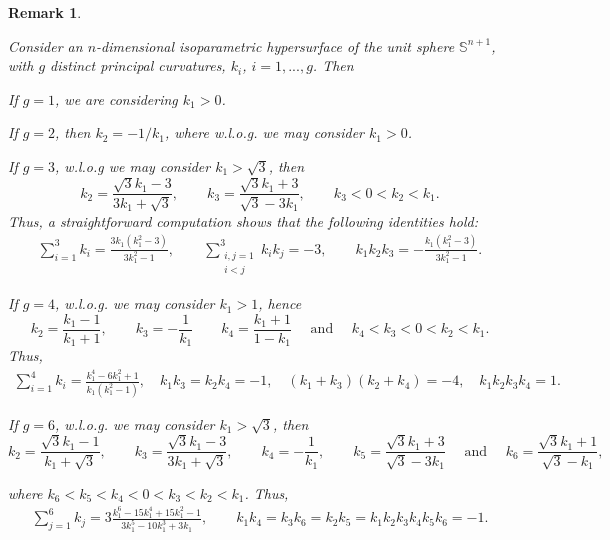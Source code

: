 \documentclass[11pt,a4paper,reqno]{amsproc}
\numberwithin{equation}{section}
\newtheorem{remark}[theorem]{\bf Remark}
\begin{document}
\begin{remark} \label{relaki}{\rm Consider an $n$-dimensional isoparametric hypersurface of the unit sphere $\mathbb{S}^{n+1}$,  
with $g$ distinct principal curvatures, $k_i$, $i=1,...,g$. Then 

 If $g=1$, we are considering $k_1>0$.

 If $g=2$, then  
$k_2=-{1}/{k_{1}}$, where w.l.o.g. we may consider $k_1>0$. 


 If $g=3$, w.l.o.g we may consider $k_{1}>\sqrt{3}$, then 
\[
	k_{2}=\frac{\sqrt{3}k_{1}-3}{3k_{1}+\sqrt{3}}, \qquad  k_{3}=\frac{\sqrt{3}k_{1}+3}{\sqrt{3}-3k_{1}}, \qquad  k_{3}<0<k_{2}<k_{1}.
\]
Thus,  a straightforward computation shows that the following  identities hold:
	\begin{eqnarray}\label{eq.p.44}
\sum_{i=1}^3k_{i}=\frac{3k_{1}(k_{1}^{2}-3)}{3k_{1}^{2}-1},\qquad  
\sum_{\substack {i,j=1 \\ i<j}}^3 k_{i}k_{j}=-3,
\qquad k_{1}k_{2}k_{3}=-\frac{k_{1}(k_{1}^{2}-3)}{3k_{1}^{2}-1}.
	\end{eqnarray}
	
 If $g=4$, w.l.o.g. we may consider $k_{1}>1$, hence 	
\[
k_{2}=\frac{k_{1}-1}{k_{1}+1},\qquad 
 k_{3}=-\frac{1}{k_{1}} \qquad 
k_{4}=\frac{k_{1}+1}{1-k_{1}}\quad \mbox{ and } \quad k_{4}<k_{3}<0<k_{2}<k_{1}.
\]
Thus,  
\begin{eqnarray}\label{eq.p.42}
\sum_{i=1}^4 k_i=\frac{k_{1}^{4}-6k_{1}^{2}+1}{k_{1}(k_{1}^{2}-1)}, \quad  
k_{1} k_{3}=k_{2}k_{4}=-1, \quad  (k_{1}+k_{3})(k_{2}+k_{4})=-4, \quad  k_{1}k_{2}k_{3}k_{4}=1. 
\end{eqnarray}

 If $g=6$,  w.l.o.g. we may consider $k_{1}>\sqrt{3}$, 	then 
\[
k_{2}=\frac{\sqrt{3}k_{1}-1}{k_{1}+\sqrt{3}}, \qquad 
  k_{3}=\frac{\sqrt{3}k_{1}-3}{3k_{1}+\sqrt{3}}, \qquad  k_{4}=-\frac{1}{k_{1}}, \qquad 
  k_{5}=\frac{\sqrt{3}k_{1}+3}{\sqrt{3}-3k_{1}} \quad \text{ and } \quad  k_{6}=\frac{\sqrt{3}k_{1}+1}{\sqrt{3}-k_{1}}, 
\]  
\vspace*{.1in}

\noindent where $k_{6}<k_{5}<k_{4}<0<k_{3}<k_{2}<k_{1}$. Thus,
\begin{eqnarray}\label{eq.p.500}
\sum_{j=1}^6  k_{j} =3 \frac{k_{1}^{6}-15k_{1}^{4}+15k_{1}^{2}-1}{3k_{1}^{5}-10k_{1}^{3}+3k_{1}}, \qquad k_{1}k_{4}=k_{3}k_{6}=k_{2}k_{5}=k_{1}k_{2}k_{3}k_{4}k_{5}k_{6}=-1.  
\end{eqnarray}

}
\end{remark}
\end{document}
